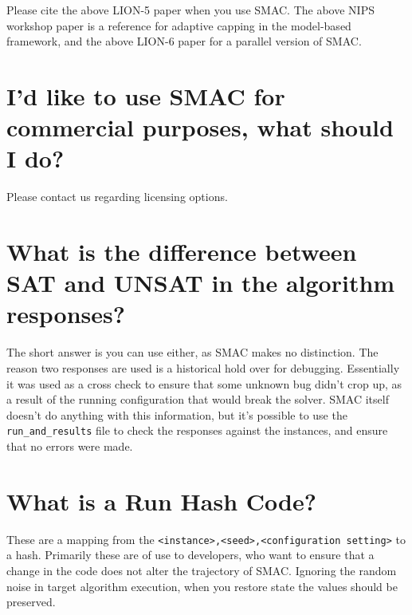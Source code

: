 \documentclass[11pt,letterpaper,oneside]{article}
\begin{document}
Please cite the above LION-5 paper when you use SMAC.
The above NIPS workshop paper is a reference for adaptive capping in the model-based framework, and the above LION-6 paper for a parallel version of SMAC.

\section{I'd like to use SMAC for commercial purposes, what should I do?}

Please contact us regarding licensing options.

\section{What is the difference between SAT and UNSAT in the algorithm responses?}

The short answer is you can use either, as SMAC makes no distinction. The reason two responses are used is a historical hold over for debugging. Essentially it was used as a cross check to ensure that some unknown bug didn't crop up, as a result of the running configuration that would break the solver. SMAC itself doesn't do anything with this information, but it's possible to use the \texttt{run\_and\_results} file to check the responses against the instances, and ensure that no errors were made.


\section{What is a Run Hash Code?}

These are a mapping from the \texttt{<instance>,<seed>,<configuration setting>} to a hash. Primarily these are of use to developers, who want to ensure that a change in the code does not alter the trajectory of SMAC. Ignoring the random noise in target algorithm execution, when you restore state the values should be preserved.
\end{document}
